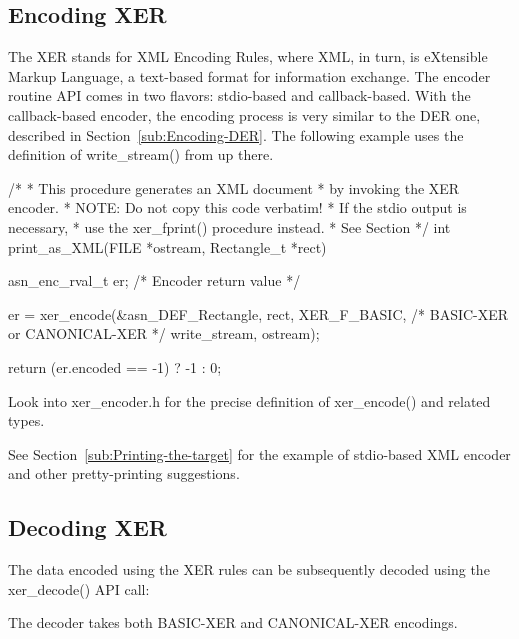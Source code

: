 \documentclass[english,oneside,12pt]{book}
\begin{document}
\subsection{\label{sub:Encoding-XER}Encoding XER}

The XER stands for XML Encoding Rules, where XML, in turn, is eXtensible
Markup Language, a text-based format for information exchange. The
encoder routine API comes in two flavors: stdio-based and callback-based.
With the callback-based encoder, the encoding process is very similar
to the DER one, described in Section~\ref{sub:Encoding-DER}. The
following example uses the definition of write\_stream() from up there.
\begin{codesample}
/*
 * This procedure generates an XML document
 * by invoking the XER encoder.
 * NOTE: Do not copy this code verbatim!
 *       If the stdio output is necessary,
 *       use the xer_fprint() procedure instead.
 *       See Section %
 */
int
print_as_XML(FILE *ostream, Rectangle_t *rect) {
    asn_enc_rval_t er;  /* Encoder return value */

    er = xer_encode(&asn_DEF_Rectangle, rect,
        XER_F_BASIC, /* BASIC-XER or CANONICAL-XER */
        write_stream, ostream);

    return (er.encoded == -1) ? -1 : 0;
}
\end{codesample}
Look into xer\_encoder.h for the precise definition of xer\_encode()
and related types.

See Section~\ref{sub:Printing-the-target} for the example of stdio-based
XML encoder and other pretty-printing suggestions.


\subsection{\label{sub:Decoding-XER}Decoding XER}

The data encoded using the XER rules can be subsequently decoded using
the xer\_decode() API call:
The decoder takes both BASIC-XER and CANONICAL-XER encodings.
\end{document}
